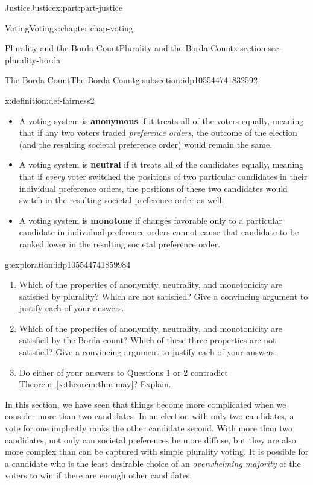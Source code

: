 \documentclass[oneside,10pt,]{book}
\newcommand{\xreffont}{\relax}
\newcommand{\terminology}[1]{\textbf{#1}}
\numberwithin{equation}{section}
\begin{document}
\begin{partptx}{Justice}{}{Justice}{}{}{x:part:part-justice}
\begin{chapterptx}{Voting}{}{Voting}{}{}{x:chapter:chap-voting}
\begin{sectionptx}{Plurality and the Borda Count}{}{Plurality and the Borda Count}{}{}{x:section:sec-plurality-borda}
\begin{subsectionptx}{The Borda Count}{}{The Borda Count}{}{}{g:subsection:idp105544741832592}
\begin{definition}{}{x:definition:def-fairness2}%
%
%
%
%
\begin{itemize}[label=\textbullet]
\item{}A voting system is \terminology{anonymous} if it treats all of the voters equally, meaning that if any two voters traded \emph{preference orders}, the outcome of the election (and the resulting societal preference order) would remain the same.%
\item{}A voting system is \terminology{neutral} if it treats all of the candidates equally, meaning that if \emph{every} voter switched the positions of two particular candidates in their individual preference orders, the positions of these two candidates would switch in the resulting societal preference order as well.%
\item{}A voting system is \terminology{monotone} if changes favorable only to a particular candidate in individual preference orders cannot cause that candidate to be ranked lower in the resulting societal preference order.%
\end{itemize}
\end{definition}
\begin{exploration}{}{g:exploration:idp105544741859984}%
%
\begin{enumerate}
\item{}Which of the properties of anonymity, neutrality, and monotonicity are satisfied by plurality? Which are not satisfied? Give a convincing argument to justify each of your answers.%
\item{}Which of the properties of anonymity, neutrality, and monotonicity are satisfied by the Borda count? Which of these three properties are not satisfied? Give a convincing argument to justify each of your answers.%
\item{}Do either of your answers to Questions 1 or 2 contradict \hyperref[x:theorem:thm-may]{Theorem~{\xreffont\ref{x:theorem:thm-may}}}? Explain.%
\end{enumerate}
\end{exploration}%
\begin{conclusion}{}%
In this section, we have seen that things become more complicated when we consider more than two candidates. In an election with only two candidates, a vote for one implicitly ranks the other candidate second. With more than two candidates, not only can societal preferences be more diffuse, but they are also more complex than can be captured with simple plurality voting. It is possible for a candidate who is the least desirable choice of an \emph{overwhelming majority} of the voters to win if there are enough other candidates.%

\end{conclusion}
\end{subsectionptx}
\end{sectionptx}
\end{chapterptx}
\end{partptx}
\end{document}
